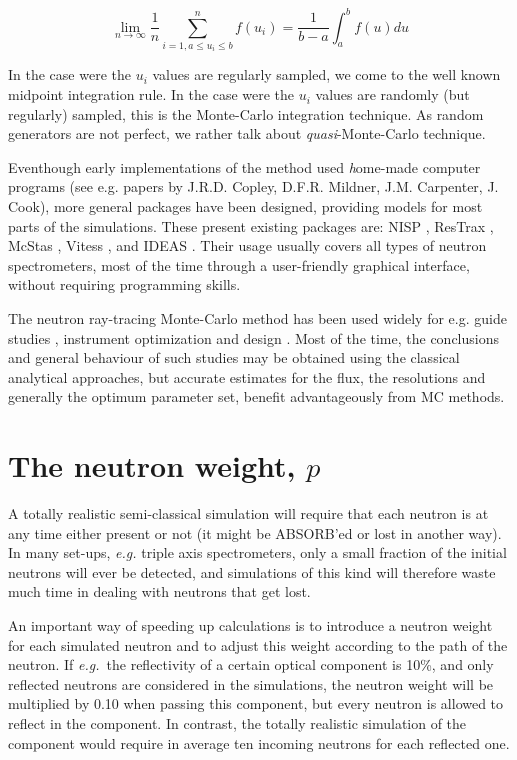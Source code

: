 \begin{equation}
\lim_{n \rightarrow \infty} \frac{1}{n} \sum_{i=1, a \leq u_i \leq b}^n f(u_i) = \frac{1}{b-a}\int_a^b f(u) du
\end{equation}

In the case were the $u_i$ values are regularly sampled, we come to the well known midpoint integration rule. In the case were the $u_i$ values are randomly (but regularly) sampled, this is the Monte-Carlo integration technique. As random generators are not perfect, we rather talk about \emph{quasi}-Monte-Carlo technique.

Eventhough early implementations of the method used {\emph home-made} computer programs  (see e.g. papers by J.R.D. Copley, D.F.R. Mildner, J.M. Carpenter, J. Cook), more general packages have been designed, providing models for most parts of the simulations.
These present existing packages are: NISP \cite{NISP}, ResTrax \cite{Restrax}, McStas \cite{nn_10_20,mcstas_pb,mcstas_webpage}, Vitess \cite{Vitess,vitess_webpage}, and IDEAS \cite{IDEAS}.
Their usage usually covers all types of neutron spectrometers, most of the time through a user-friendly graphical interface, without requiring programming skills.

The neutron ray-tracing Monte-Carlo method has been used widely for e.g. guide studies \cite{Copley93,Farhi02,Schanzer04}, instrument optimization and design \cite{Zsigmond04,Lieutenant05}. Most of the time, the conclusions and general behaviour of such studies may be obtained using the classical analytical approaches, but accurate estimates for the flux, the resolutions and generally the optimum parameter set, benefit advantageously from MC methods.

\section{The neutron weight, $p$}
\label{s:probweight}
A totally realistic semi-classical simulation will require that
each neutron is at any time either present or not
(it might be ABSORB'ed or lost in another way).
In many set-ups, {\em e.g.} triple axis spectrometers, only a
small fraction of the initial neutrons will ever be detected, and
simulations of this kind will therefore waste much time in dealing
with neutrons that get lost.

An important way of speeding up calculations is to introduce
a neutron weight for each simulated neutron and to
adjust this weight according to the path of the neutron.
If {\em e.g.}\ the reflectivity of a certain
optical component is 10\%, and only reflected neutrons are
considered in the simulations, the neutron
weight will be multiplied by 0.10 when passing this component,
but every neutron is allowed to reflect in the component.
In contrast, the totally realistic simulation of the component
would require in average ten incoming neutrons for each reflected one.

